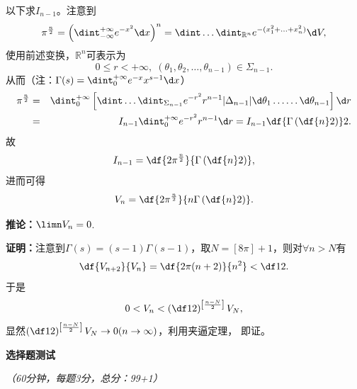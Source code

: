以下求$I_{n-1}$。注意到
$$\pi^{\frac n2}=\left(\dint_{-\infty}^{+\infty}e^{-x^2}\d x\right)^n
=\dint\ldots\dint_{\mathbb{R}^n}e^{-(x_1^2+\ldots+x_n^2)}\d V,$$
使用前述变换，$\mathbb{R}^n$可表示为
$$0\leq r<+\infty,
\;(\theta_1,\theta_2,\ldots,\theta_{n-1})\in\Sigma_{n-1}.$$
从而（注：$\Gamma(s)=\dint_0^{+\infty}e^{-x}x^{s-1}\d x$）
\begin{eqnarray*}
	\pi^{\frac n2}&=&\dint_0^{+\infty}
	\left[\dint\ldots\dint_{\Sigma_{n-1}}e^{-r^2}r^{n-1}|\Delta_{n-1}|
	\d\theta_1\ldots\ldots\d\theta_{n-1}\right]\d r\\
	&=&I_{n-1}\dint_0^{+\infty}e^{-r^2}r^{n-1}\d r
	=I_{n-1}\df{\Gamma\left(\df{n}2\right)}2.
\end{eqnarray*}
故
$$I_{n-1}=\df{2\pi^{\frac n2}}{\Gamma\left(\df{n}2\right)},$$
进而可得
$$V_n=\df{2\pi^{\frac n2}}{n\Gamma\left(\df{n}2\right)}.$$

{\bf 推论：}$\limn V_n=0$.

{\bf 证明：}注意到$\Gamma(s)=(s-1)\Gamma(s-1)$，取$N=[8\pi]+1$，则对$\forall n>N$有
$$\df{V_{n+2}}{V_n}=\df{2\pi(n+2)}{n^2}<\df12.$$
于是
$$0<V_n<\left(\df12\right)^{\left[\frac{n-N}2\right]}V_N,$$
显然$\left(\df12\right)^{\left[\frac{n-N}2\right]}V_N\to0(n\to\infty)$，利用夹逼定理，
即证。


\newpage

\begin{center}
	{\Large\bf 选择题测试}
	
	{\it （60分钟，每题3分，总分：99+1）}
\end{center}

